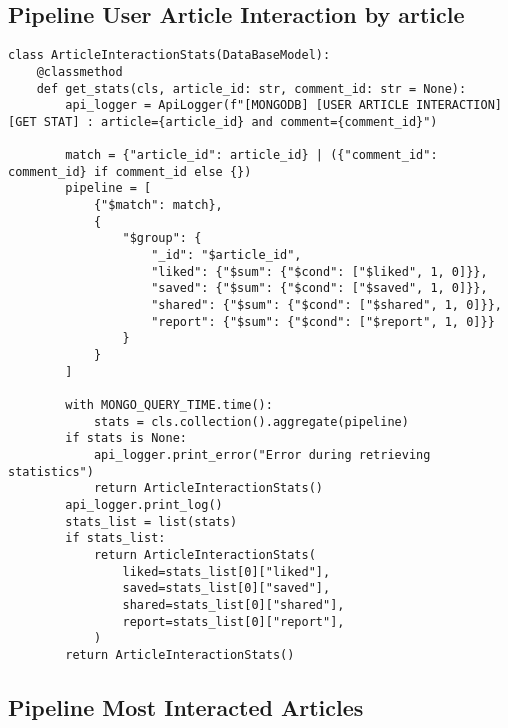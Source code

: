 \subsection{Pipeline User Article Interaction by article}\label{subsec:pipeline-user-article-interaction-by-article}

\begin{lstlisting}[style=pythonstyle,label={lst:pipeline-user-article-interaction-by-article},caption={Pipeline User Article Interaction by article}]
class ArticleInteractionStats(DataBaseModel):
    @classmethod
    def get_stats(cls, article_id: str, comment_id: str = None):
        api_logger = ApiLogger(f"[MONGODB] [USER ARTICLE INTERACTION] [GET STAT] : article={article_id} and comment={comment_id}")

        match = {"article_id": article_id} | ({"comment_id": comment_id} if comment_id else {})
        pipeline = [
            {"$match": match},
            {
                "$group": {
                    "_id": "$article_id",
                    "liked": {"$sum": {"$cond": ["$liked", 1, 0]}},
                    "saved": {"$sum": {"$cond": ["$saved", 1, 0]}},
                    "shared": {"$sum": {"$cond": ["$shared", 1, 0]}},
                    "report": {"$sum": {"$cond": ["$report", 1, 0]}}
                }
            }
        ]

        with MONGO_QUERY_TIME.time():
            stats = cls.collection().aggregate(pipeline)
        if stats is None:
            api_logger.print_error("Error during retrieving statistics")
            return ArticleInteractionStats()
        api_logger.print_log()
        stats_list = list(stats)
        if stats_list:
            return ArticleInteractionStats(
                liked=stats_list[0]["liked"],
                saved=stats_list[0]["saved"],
                shared=stats_list[0]["shared"],
                report=stats_list[0]["report"],
            )
        return ArticleInteractionStats()
\end{lstlisting}


\subsection{Pipeline Most Interacted Articles}\label{subsec:pipeline-most-interacted-articles}

